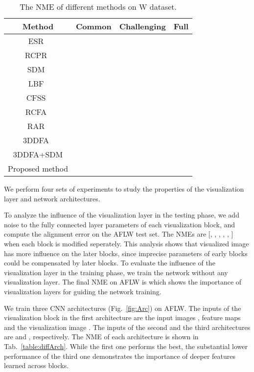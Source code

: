 \begin{table}[t!]\small
\caption{The NME of different methods on W dataset.}
\begin{center}
\begin{tabular}{ c|c|c|c } 
 \hline
 Method & Common & Challenging & Full \\ 
 \hline
 ESR~\cite{cao2014face} &  &  &  \\
 RCPR~\cite{burgos2013robust} &  &  &  \\
 SDM~\cite{xiong2013supervised} &  &  &  \\
 LBF~\cite{ren2014face} &  &  &  \\
 CFSS~\cite{zhu2015face} &  &  &  \\
 RCFA~\cite{wang2016recurrent} &  &  &  \\
 RAR~\cite{xiao2016robust} &  &  &  \\
 3DDFA~\cite{zhu2015face} &  &  &  \\
 3DDFA+SDM &  &  &  \\
 \hline  
 Proposed method &  &  &  \\
\hline  
\end{tabular}
\end{center}
\label{table:300WRes}\vspace{-10mm}
\end{table}



\vspace{-2mm}
\vspace{-2mm}
We perform four sets of experiments to study the properties of the visualization layer and network architectures. 


To analyze the influence of the visualization layer in the testing phase, we add  noise to the fully connected layer parameters of each visualization block, and compute the alignment error on the AFLW test set. 
The NMEs are [, , , , , ] when each block is modified seperately. 
This analysis shows that visualized image has more influence on the later blocks, since imprecise parameters of early blocks could be compensated by later blocks. 
To evaluate the influence of the visualization layer in the training phase, we train the network without any visualization layer. 
The final NME on AFLW is  which shows the importance of visualization layers for guiding the network training.

We train three CNN architectures (Fig.~\ref{fig:Arc}) on AFLW. 
The inputs of the visualization block in the first architecture are the input images , feature maps  and the visualization image . The inputs of the second and the third architectures are  and , respectively. 
The NME of each architecture is shown in Tab.~\ref{table:diffArch}.
While the first one performs the best, the substantial lower performance of the third one demonstrates the importance of deeper features learned across blocks.


